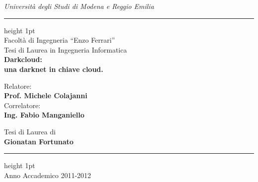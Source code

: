 \makeatletter
\def\thickhrulefill{\leavevmode \leaders \hrule height 1pt\hfill \kern \z@}
\renewcommand{\maketitle}{\begin{titlepage}%
\thispagestyle{empty}
\begin{centering}
\Large
\textit{Universit\`a degli Studi di Modena e Reggio Emilia} \\
\vspace{0.2cm}
\thickhrulefill\\
\vspace{0.2cm}
Facolt\`a di Ingegneria ``Enzo Ferrari'' \\
Tesi di Laurea in
Ingegneria Informatica\\
\vspace{7cm}
{\huge\textbf{Darkcloud:\\
una darknet in chiave cloud.}}
\textbf{}\vspace{8cm}

\large
\begin{minipage}{.5\textwidth}
\begin{flushleft}
Relatore:\\
\textbf{Prof. Michele Colajanni}\\
\vspace{7mm}
Correlatore:\\
\textbf{Ing. Fabio Manganiello}\\
\end{flushleft}
\end{minipage}
\begin{minipage}{.5\textwidth}
\begin{flushright}
Tesi di Laurea di\\
\textbf{Gionatan Fortunato}\\
\end{flushright}
\end{minipage}
\end{centering}
\begin{center}
\vspace{1cm}
\thickhrulefill\\
Anno Accademico 2011-2012
\end{center}
\clearpage
\thispagestyle{empty}
\clearpage
\end{titlepage}%
}

\maketitle

